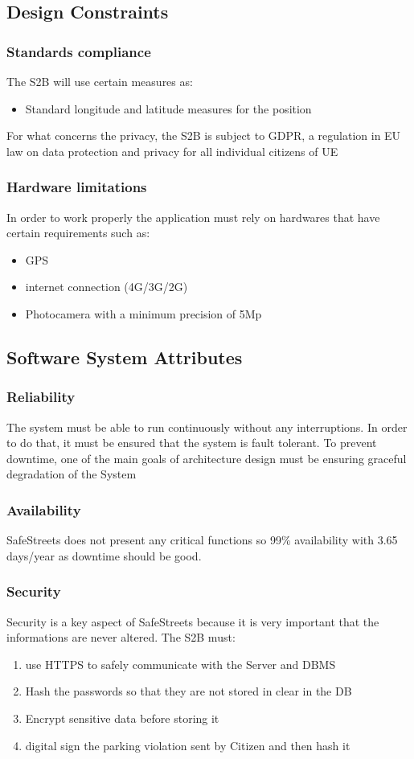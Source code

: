 \documentclass{article}
\begin{document}
\subsection{Design Constraints}
\subsubsection{Standards compliance}
The S2B  will use certain measures as:
\begin{itemize}
    \item Standard longitude and latitude measures for the position
\end{itemize}
For what concerns the privacy, the S2B is subject to GDPR, a regulation in EU law on data protection 
and privacy for all individual citizens of UE  

\subsubsection{Hardware limitations}
In order to work properly the application must rely on hardwares that have certain requirements 
such as:
\begin{itemize}
    \item GPS
    \item internet connection (4G/3G/2G)
    \item Photocamera with a minimum precision of 5Mp 
\end{itemize}   

\subsection{Software System Attributes}
\subsubsection{Reliability}
The system must be able to run continuously without any interruptions. In order to do that, it must be ensured 
that the system is fault tolerant. To prevent downtime, one of the main goals of architecture design must be 
ensuring graceful degradation of the System
\subsubsection{Availability}
SafeStreets does not present any critical functions so 99\% availability with 3.65 days/year
as downtime should be good.  
\subsubsection{Security}
Security is a key aspect of SafeStreets because it is very important that the informations are never altered.
The S2B must:
\begin{enumerate}
 \item use HTTPS to safely communicate with the Server and DBMS    
 \item Hash the passwords so that they are not stored in clear in the DB
 \item Encrypt sensitive data before storing it
 \item digital sign the parking violation sent by Citizen and then hash it  
\end{enumerate} 
\end{document}
